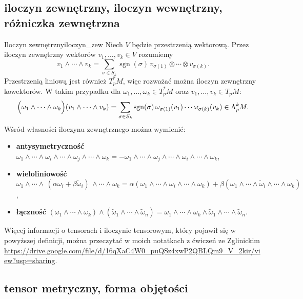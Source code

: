 \documentclass{article}
\newcommand{\sgn}{\operatorname{sgn}}
\begin{document}
\subsection{iloczyn zewnętrzny, iloczyn wewnętrzny, różniczka zewnętrzna} \label{sec:iloczyny_różniczka}

\begin{dfn}{Iloczyn zewnętrzny}{iloczyn_zew}
  Niech $V$ będzie przestrzenią wektorową. Przez iloczyn zewnętrzny wektorów $v_1,\ldots,v_k\in V$ rozumiemy
  \[
  v_1\wedge\cdots\wedge v_k = \sum_{\sigma\in S_k} \sgn(\sigma)\, v_{\sigma(1)}\otimes\cdots\otimes v_{\sigma(k)}. 
  \]
  Przestrzenią liniową jest również $T^*_p M$, więc rozważać można iloczyn zewnętrzny kowektorów. W takim przypadku dla $\omega_1,\ldots,\omega_k\in T^*_p M$ oraz $v_1,\ldots,v_k\in T_p M$:
  \[
  \Bigl( \omega_1\wedge\cdots\wedge\omega_k \Bigr)(v_1\wedge\cdots\wedge v_k) = \sum_{\sigma\in S_k} \sgn(\sigma)\, \omega_{\sigma(1)}(v_1)\cdots \omega_{\sigma(k)}(v_k) \in \Lambda^k_p M.
  \]
  Wśród własności iloczynu zewnętrznego można wymienić:
  \begin{itemize}
    \item \textbf{antysymetryczność} $\omega_1\wedge\cdots\wedge\omega_i\wedge\cdots\wedge\omega_j\wedge\cdots\wedge\omega_k = -\omega_1\wedge\cdots\wedge\omega_j\wedge\cdots\wedge\omega_i\wedge\cdots\wedge\omega_k$,
    \item \textbf{wieloliniowość} $\omega_1\wedge\cdots\wedge\,(\alpha\omega_i+\beta\widetilde{\omega}_i)\,\wedge\cdots\wedge\omega_k = \alpha(\omega_1\wedge\cdots\wedge\omega_i\wedge\cdots\wedge\omega_k) + \beta(\omega_1\wedge\cdots\wedge\widetilde{\omega}_i\wedge\cdots\wedge\omega_k)$,
    \item \textbf{łączność} $(\omega_1\wedge\cdots\wedge\omega_k)\wedge(\widetilde{\omega}_1\wedge\cdots\wedge\widetilde{\omega}_n)=\omega_1\wedge\cdots\wedge\omega_k\wedge\widetilde{\omega}_1\wedge\cdots\wedge\widetilde{\omega}_n$.
  \end{itemize}
\end{dfn}
Więcej informacji o tensorach i iloczynie tensorowym, który pojawił się w powyższej definicji, można przeczytać w moich notatkach z ćwiczeń ze Zglinickim \url{https://drive.google.com/file/d/16qXaC4W0_puQSz4xwP2QBLQm9_V_2kir/view?usp=sharing}.














\subsection{tensor metryczny, forma objętości}\label{sec:tensor_metryczny_vol}
\end{document}
